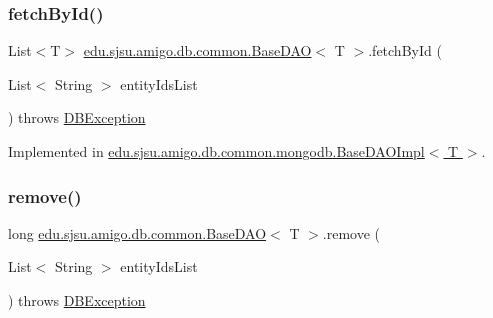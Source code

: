 \mbox{\label{interfaceedu_1_1sjsu_1_1amigo_1_1db_1_1common_1_1_base_d_a_o_a37db1a13eee71618f11b7e07d3b13ac4}} 
\subsubsection{\texorpdfstring{fetch\+By\+Id()}{fetchById()}}
{\footnotesize\ttfamily List$<$T$>$ \hyperlink{interfaceedu_1_1sjsu_1_1amigo_1_1db_1_1common_1_1_base_d_a_o}{edu.\+sjsu.\+amigo.\+db.\+common.\+Base\+D\+AO}$<$ T $>$.fetch\+By\+Id (\begin{DoxyParamCaption}\item[{List$<$ String $>$}]{entity\+Ids\+List }\end{DoxyParamCaption}) throws \hyperlink{classedu_1_1sjsu_1_1amigo_1_1db_1_1common_1_1_d_b_exception}{D\+B\+Exception}}



Implemented in \hyperlink{classedu_1_1sjsu_1_1amigo_1_1db_1_1common_1_1mongodb_1_1_base_d_a_o_impl_a0f44ed7ba8e92fa387be39194177e4cf}{edu.\+sjsu.\+amigo.\+db.\+common.\+mongodb.\+Base\+D\+A\+O\+Impl$<$ T $>$}.

\mbox{\label{interfaceedu_1_1sjsu_1_1amigo_1_1db_1_1common_1_1_base_d_a_o_ad41557807ba9feaeebff9705ce68478d}} 
\subsubsection{\texorpdfstring{remove()}{remove()}}
{\footnotesize\ttfamily long \hyperlink{interfaceedu_1_1sjsu_1_1amigo_1_1db_1_1common_1_1_base_d_a_o}{edu.\+sjsu.\+amigo.\+db.\+common.\+Base\+D\+AO}$<$ T $>$.remove (\begin{DoxyParamCaption}\item[{List$<$ String $>$}]{entity\+Ids\+List }\end{DoxyParamCaption}) throws \hyperlink{classedu_1_1sjsu_1_1amigo_1_1db_1_1common_1_1_d_b_exception}{D\+B\+Exception}}



